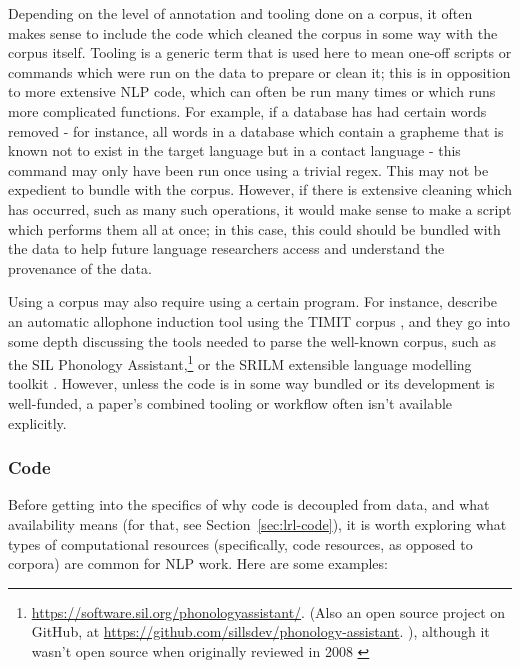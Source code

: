 Depending on the level of annotation and tooling done on a corpus, it often makes sense to include the code which cleaned the corpus in some way with the corpus itself. Tooling is a generic term that is used here to mean one-off scripts or commands which were run on the data to prepare or clean it; this is in opposition to more extensive NLP code, which can often be run many times or which runs more complicated functions. For example, if a database has had certain words removed - for instance, all words in a database which contain a grapheme that is known not to exist in the target language but in a contact language - this command may only have been run once using a trivial regex. This may not be expedient to bundle with the corpus. However, if there is extensive cleaning which has occurred, such as many such operations, it would make sense to make a script which performs them all at once; in this case, this could should be bundled with the data to help future language researchers access and understand the provenance of the data. 

Using a corpus may also require using a certain program. For instance, \citet{kempton2009finding} describe an automatic allophone induction tool using the TIMIT corpus \citep{garofolo1993darpa}, and they go into some depth discussing the tools needed to parse the well-known corpus, such as the SIL Phonology Assistant,\footnote{\href{https://software.sil.org/phonologyassistant/}{https://software.sil.org/phonologyassistant/}.  (Also an open source project on GitHub, at \href{https://github.com/sillsdev/phonology-assistant}{https://github.com/sillsdev/phonology-assistant}. ), although it wasn't open source when originally reviewed in 2008 \citep{dingemanse2008review}} or the SRILM extensible language modelling toolkit \citep{stolcke2002srilm}. However, unless the code is in some way bundled or its development is well-funded, a paper's combined tooling or workflow often isn't available explicitly.

\subsubsection{Code}
\label{sec:resources-code}

Before getting into the specifics of why code is decoupled from data, and what availability means (for that, see Section~\ref{sec:lrl-code}), it is worth exploring what types of computational resources (specifically, code resources, as opposed to corpora) are common for NLP work. Here are some examples:

